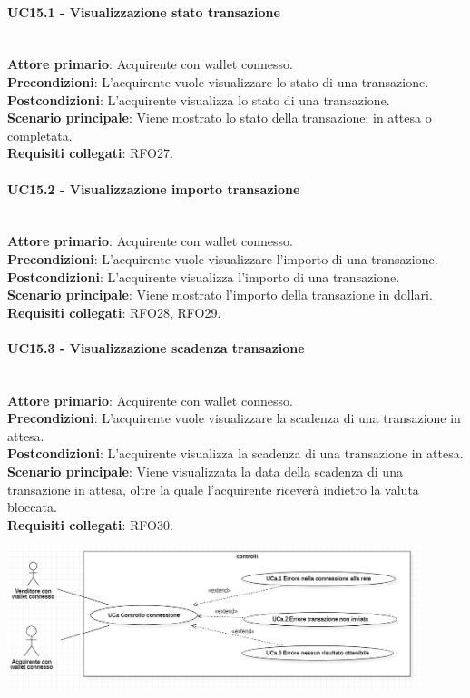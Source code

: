 \documentclass[a4paper, 12pt]{article}
\begin{document}
\paragraph{UC15.1 - Visualizzazione stato transazione}\\
\textbf{Attore primario}: Acquirente con wallet connesso.\\
\textbf{Precondizioni}: L'acquirente vuole visualizzare lo stato di una transazione.\\
\textbf{Postcondizioni}: L'acquirente visualizza lo stato di una transazione.\\
\textbf{Scenario principale}: Viene mostrato lo stato della transazione: in attesa o completata.\\
\textbf{Requisiti collegati}: RFO27.

\paragraph{UC15.2 - Visualizzazione importo transazione}\\
\textbf{Attore primario}: Acquirente con wallet connesso.\\
\textbf{Precondizioni}: L'acquirente vuole visualizzare l'importo di una transazione.\\
\textbf{Postcondizioni}: L'acquirente visualizza l'importo di una transazione.\\
\textbf{Scenario principale}: Viene mostrato l'importo della transazione in dollari.\\
\textbf{Requisiti collegati}: RFO28, RFO29.

\paragraph{UC15.3 - Visualizzazione scadenza transazione}\\
\textbf{Attore primario}: Acquirente  con wallet connesso.\\
\textbf{Precondizioni}: L'acquirente vuole visualizzare la scadenza di una transazione in attesa.\\
\textbf{Postcondizioni}: L'acquirente visualizza la scadenza di una transazione in attesa.\\
\textbf{Scenario principale}: Viene visualizzata la data della scadenza di una transazione in attesa, oltre la quale l'acquirente riceverà indietro la valuta bloccata.\\
\textbf{Requisiti collegati}: RFO30.

\includegraphics[width=0.9\textwidth]{UC_controlli}
\end{document}
